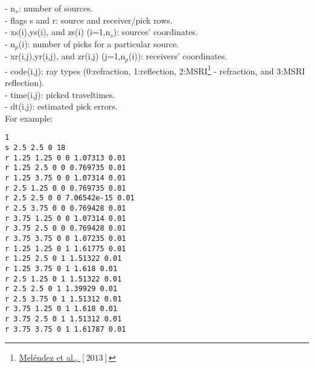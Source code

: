 \documentclass[twoside,final,onecolumn]{article}
\begin{document}
\noindent - n$_{s}$: number of sources.\\
- flags s and r: source and receiver/pick rows.\\
- xs(i),ys(i), and zs(i) (i=1,n$_{s}$): sources' coordinates.\\
- n$_{p}$(i): number of picks for a particular source.\\
- xr(i,j),yr(i,j), and zr(i,j) (j=1,n$_{p}$(i)): receivers' coordinates.\\
- code(i,j): ray types (0:refraction, 1:reflection, 2:MSRI\footnote{\href{http://www.dx.doi.org/10.1093/gji/ggt391}{Mel\'{e}ndez et al., $[2013]$}} 
- refraction, and 3:MSRI reflection).\\
- time(i,j): picked traveltimes.\\
- dt(i,j): estimated pick errors.\\
\newline
For example:
\begin{verbatim}
1
s 2.5 2.5 0 18
r 1.25 1.25 0 0 1.07313 0.01
r 1.25 2.5 0 0 0.769735 0.01
r 1.25 3.75 0 0 1.07314 0.01
r 2.5 1.25 0 0 0.769735 0.01
r 2.5 2.5 0 0 7.06542e-15 0.01
r 2.5 3.75 0 0 0.769428 0.01
r 3.75 1.25 0 0 1.07314 0.01
r 3.75 2.5 0 0 0.769428 0.01
r 3.75 3.75 0 0 1.07235 0.01
r 1.25 1.25 0 1 1.61775 0.01
r 1.25 2.5 0 1 1.51322 0.01
r 1.25 3.75 0 1 1.618 0.01
r 2.5 1.25 0 1 1.51322 0.01
r 2.5 2.5 0 1 1.39929 0.01
r 2.5 3.75 0 1 1.51312 0.01
r 3.75 1.25 0 1 1.618 0.01
r 3.75 2.5 0 1 1.51312 0.01
r 3.75 3.75 0 1 1.61787 0.01
\end{verbatim}
\end{document}
